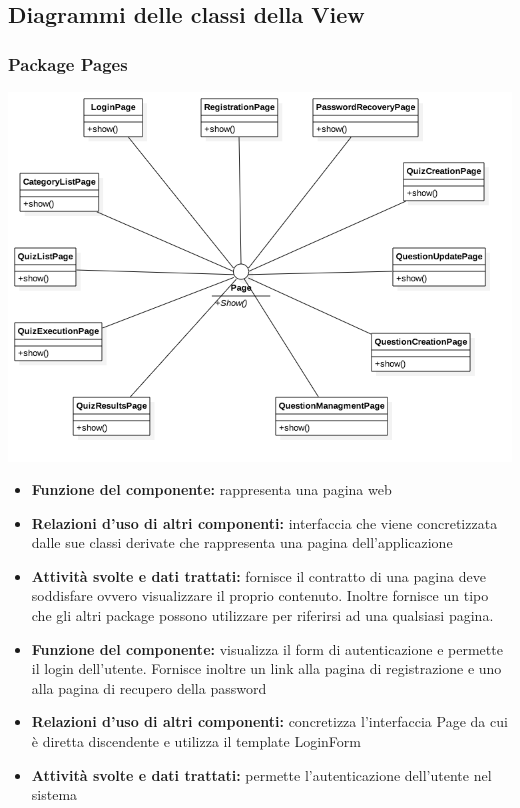 \subsection{Diagrammi delle classi della View}	
		
	\subsubsection{Package Pages}
		\begin{center}
			\centerline{\includegraphics[scale=0.6]{../images/Pages.png}}
		\end{center}
			\begin{itemize}
		    		\item\textbf{Funzione del componente:} rappresenta una pagina web
				\item\textbf{Relazioni d'uso di altri componenti:} interfaccia che viene concretizzata dalle sue classi derivate che rappresenta una pagina dell'applicazione
				\item\textbf{Attività svolte e dati trattati:} fornisce il contratto di una pagina deve soddisfare ovvero visualizzare il proprio contenuto. Inoltre fornisce un tipo che gli altri package possono utilizzare per riferirsi ad una qualsiasi pagina.
			\end{itemize}
			\begin{itemize}
		    		\item\textbf{Funzione del componente:} visualizza il form di autenticazione e permette il login dell'utente. Fornisce inoltre un link alla pagina di registrazione e uno alla pagina di recupero della password 
				\item\textbf{Relazioni d'uso di altri componenti:} concretizza l'interfaccia Page da cui è diretta discendente e utilizza il template LoginForm
				\item\textbf{Attività svolte e dati trattati:} permette l'autenticazione dell'utente nel sistema
			\end{itemize}
